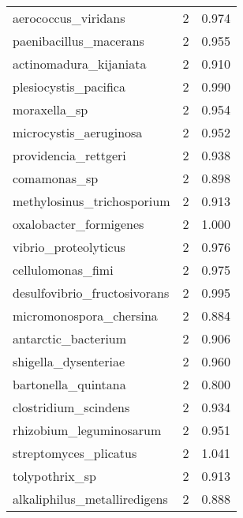\begin{tabular}{lrr}
                         aerococcus\_viridans &                   2 &     0.974 \\
                      paenibacillus\_macerans &                   2 &     0.955 \\
                      actinomadura\_kijaniata &                   2 &     0.910 \\
                       plesiocystis\_pacifica &                   2 &     0.990 \\
                                moraxella\_sp &                   2 &     0.954 \\
                      microcystis\_aeruginosa &                   2 &     0.952 \\
                        providencia\_rettgeri &                   2 &     0.938 \\
                                comamonas\_sp &                   2 &     0.898 \\
                  methylosinus\_trichosporium &                   2 &     0.913 \\
                      oxalobacter\_formigenes &                   2 &     1.000 \\
                        vibrio\_proteolyticus &                   2 &     0.976 \\
                           cellulomonas\_fimi &                   2 &     0.975 \\
                desulfovibrio\_fructosivorans &                   2 &     0.995 \\
                     micromonospora\_chersina &                   2 &     0.884 \\
                         antarctic\_bacterium &                   2 &     0.906 \\
                        shigella\_dysenteriae &                   2 &     0.960 \\
                         bartonella\_quintana &                   2 &     0.800 \\
                        clostridium\_scindens &                   2 &     0.934 \\
                     rhizobium\_leguminosarum &                   2 &     0.951 \\
                       streptomyces\_plicatus &                   2 &     1.041 \\
                              tolypothrix\_sp &                   2 &     0.913 \\
                alkaliphilus\_metalliredigens &                   2 &     0.888 \\

\end{tabular}

